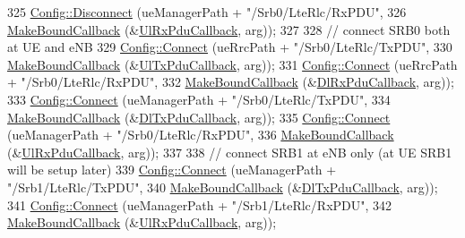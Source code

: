 \begin{DoxyCode}
325       \hyperlink{group__config_ga33e975bd2ed84e3353b2a3356d90fc1d}{Config::Disconnect} (ueManagerPath + \textcolor{stringliteral}{"/Srb0/LteRlc/RxPDU"},
326                           \hyperlink{group__makeboundcallback_ga1725d6362e6065faa0709f7c93f8d770}{MakeBoundCallback} (&\hyperlink{namespacens3_a269527c03607c9c885d7cff7667ec5e0}{UlRxPduCallback}, arg));
327 
328       \textcolor{comment}{// connect SRB0 both at UE and eNB}
329       \hyperlink{group__config_ga4014f151241cd0939b6cb64409605736}{Config::Connect} (ueRrcPath + \textcolor{stringliteral}{"/Srb0/LteRlc/TxPDU"},
330                        \hyperlink{group__makeboundcallback_ga1725d6362e6065faa0709f7c93f8d770}{MakeBoundCallback} (&\hyperlink{namespacens3_ae624428f0992ac62a3c5f2e7318fb98e}{UlTxPduCallback}, arg));
331       \hyperlink{group__config_ga4014f151241cd0939b6cb64409605736}{Config::Connect} (ueRrcPath + \textcolor{stringliteral}{"/Srb0/LteRlc/RxPDU"},
332                        \hyperlink{group__makeboundcallback_ga1725d6362e6065faa0709f7c93f8d770}{MakeBoundCallback} (&\hyperlink{namespacens3_ae4fb5123d8a56fce742428b530ec4197}{DlRxPduCallback}, arg));
333       \hyperlink{group__config_ga4014f151241cd0939b6cb64409605736}{Config::Connect} (ueManagerPath + \textcolor{stringliteral}{"/Srb0/LteRlc/TxPDU"},
334                        \hyperlink{group__makeboundcallback_ga1725d6362e6065faa0709f7c93f8d770}{MakeBoundCallback} (&\hyperlink{namespacens3_a7de82f7ed9986b9bcb67951f61e02ff4}{DlTxPduCallback}, arg));
335       \hyperlink{group__config_ga4014f151241cd0939b6cb64409605736}{Config::Connect} (ueManagerPath + \textcolor{stringliteral}{"/Srb0/LteRlc/RxPDU"},
336                        \hyperlink{group__makeboundcallback_ga1725d6362e6065faa0709f7c93f8d770}{MakeBoundCallback} (&\hyperlink{namespacens3_a269527c03607c9c885d7cff7667ec5e0}{UlRxPduCallback}, arg));
337 
338       \textcolor{comment}{// connect SRB1 at eNB only (at UE SRB1 will be setup later)}
339       \hyperlink{group__config_ga4014f151241cd0939b6cb64409605736}{Config::Connect} (ueManagerPath + \textcolor{stringliteral}{"/Srb1/LteRlc/TxPDU"},
340                        \hyperlink{group__makeboundcallback_ga1725d6362e6065faa0709f7c93f8d770}{MakeBoundCallback} (&\hyperlink{namespacens3_a7de82f7ed9986b9bcb67951f61e02ff4}{DlTxPduCallback}, arg));
341       \hyperlink{group__config_ga4014f151241cd0939b6cb64409605736}{Config::Connect} (ueManagerPath + \textcolor{stringliteral}{"/Srb1/LteRlc/RxPDU"},
342                        \hyperlink{group__makeboundcallback_ga1725d6362e6065faa0709f7c93f8d770}{MakeBoundCallback} (&\hyperlink{namespacens3_a269527c03607c9c885d7cff7667ec5e0}{UlRxPduCallback}, arg));

\end{DoxyCode}
